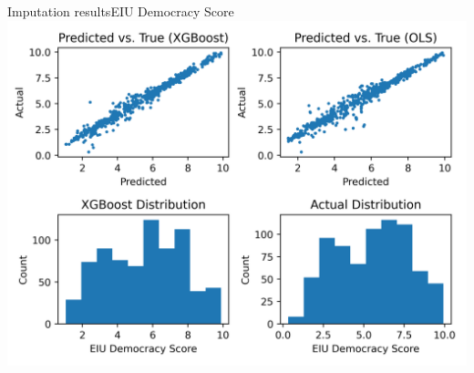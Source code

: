 \documentclass[10pt]{beamer}
\begin{document}
\begin{frame}{Imputation results}{EIU Democracy Score}
    \centering
    \includegraphics[width=\textwidth]{../build/eiu_xgboost.png}
\end{frame}
\end{document}
